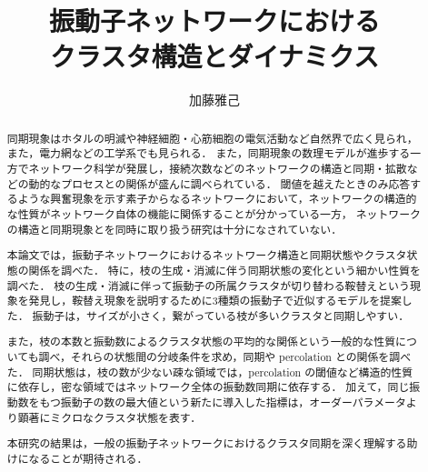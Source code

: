 \documentclass[system, bachelor]{systemB}%
\title{振動子ネットワークにおける\\クラスタ構造とダイナミクス}
\author{加藤雅己}
\theoremstyle{break}
\begin{document}
\maketitle%

\frontmatter%



\begin{abstract}%
  同期現象はホタルの明滅や神経細胞・心筋細胞の電気活動など自然界で広く見られ，また，電力網などの工学系でも見られる．
  また，同期現象の数理モデルが進歩する一方でネットワーク科学が発展し，接続次数などのネットワークの構造と同期・拡散などの動的なプロセスとの関係が盛んに調べられている．  
  閾値を越えたときのみ応答するような興奮現象を示す素子からなるネットワークにおいて，ネットワークの構造的な性質がネットワーク自体の機能に関係することが分かっている一方，
  ネットワークの構造と同期現象とを同時に取り扱う研究は十分になされていない．
  
  本論文では，振動子ネットワークにおけるネットワーク構造と同期状態やクラスタ状態の関係を調べた．
  特に，枝の生成・消滅に伴う同期状態の変化という細かい性質を調べた．
  枝の生成・消滅に伴って振動子の所属クラスタが切り替わる鞍替えという現象を発見し，鞍替え現象を説明するために3種類の振動子で近似するモデルを提案した．
  振動子は，サイズが小さく，繋がっている枝が多いクラスタと同期しやすい．
  
  また，枝の本数と振動数によるクラスタ状態の平均的な関係という一般的な性質についても調べ，それらの状態間の分岐条件を求め，同期や percolation との関係を調べた．
  同期状態は，枝の数が少ない疎な領域では，percolation の閾値など構造的性質に依存し，密な領域ではネットワーク全体の振動数同期に依存する．
  加えて，同じ振動数をもつ振動子の数の最大値という新たに導入した指標は，オーダーパラメータより顕著にミクロなクラスタ状態を表す．
  
  本研究の結果は，一般の振動子ネットワークにおけるクラスタ同期を深く理解する助けになることが期待される．
\end{abstract}


{\makeatletter
\let\ps@jpl@in\ps@empty
\makeatother
\pagestyle{empty}
\tableofcontents
\clearpage}

\mainmatter%






\backmatter%
\end{document}
